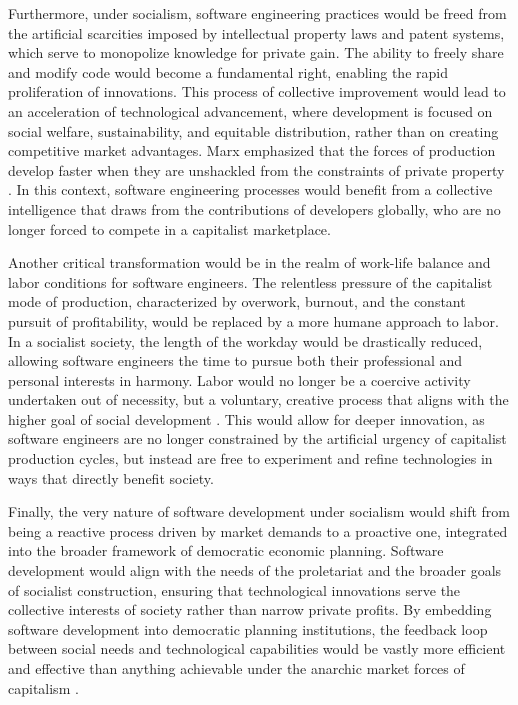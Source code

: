\begin{refsection}
Furthermore, under socialism, software engineering practices would be freed from the artificial scarcities imposed by intellectual property laws and patent systems, which serve to monopolize knowledge for private gain. The ability to freely share and modify code would become a fundamental right, enabling the rapid proliferation of innovations. This process of collective improvement would lead to an acceleration of technological advancement, where development is focused on social welfare, sustainability, and equitable distribution, rather than on creating competitive market advantages. Marx emphasized that the forces of production develop faster when they are unshackled from the constraints of private property \cite[pp.~352-354]{marx1867}. In this context, software engineering processes would benefit from a collective intelligence that draws from the contributions of developers globally, who are no longer forced to compete in a capitalist marketplace.

Another critical transformation would be in the realm of work-life balance and labor conditions for software engineers. The relentless pressure of the capitalist mode of production, characterized by overwork, burnout, and the constant pursuit of profitability, would be replaced by a more humane approach to labor. In a socialist society, the length of the workday would be drastically reduced, allowing software engineers the time to pursue both their professional and personal interests in harmony. Labor would no longer be a coercive activity undertaken out of necessity, but a voluntary, creative process that aligns with the higher goal of social development \cite[pp.~171-173]{marx1932}. This would allow for deeper innovation, as software engineers are no longer constrained by the artificial urgency of capitalist production cycles, but instead are free to experiment and refine technologies in ways that directly benefit society.

Finally, the very nature of software development under socialism would shift from being a reactive process driven by market demands to a proactive one, integrated into the broader framework of democratic economic planning. Software development would align with the needs of the proletariat and the broader goals of socialist construction, ensuring that technological innovations serve the collective interests of society rather than narrow private profits. By embedding software development into democratic planning institutions, the feedback loop between social needs and technological capabilities would be vastly more efficient and effective than anything achievable under the anarchic market forces of capitalism \cite[pp.~290-292]{lenin1920}. 


\end{refsection}
